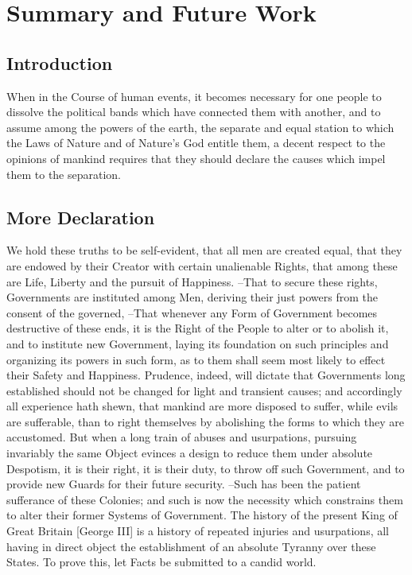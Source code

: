 \chapter{Summary and Future Work}

\section{Introduction}
When in the Course of human events, it becomes necessary for one people  to dissolve the political bands which have connected them with another,  and to assume among the powers of the earth, the separate and equal station  to which the Laws of Nature and of Nature's God entitle them, a decent respect to the opinions of mankind requires that they should declare  the causes which impel them to the separation.

\section{More Declaration}

We hold these truths to be self-evident, that all men are created equal,  that they are endowed by their Creator with certain unalienable Rights,  that among these are Life, Liberty and the pursuit of Happiness. --That to secure these  rights, Governments are instituted among Men, deriving their just powers  from the consent of the governed, --That whenever any Form of Government  becomes destructive of these ends, it is the Right of the People to alter  or to abolish it, and to institute new Government, laying its foundation on  such principles and organizing its powers in such form, as to them shall  seem most likely to effect their Safety and Happiness. Prudence, indeed, will dictate that Governments long established should not  be changed for light and transient causes; and accordingly all experience  hath shewn, that mankind are more disposed to suffer, while evils are  sufferable, than to right themselves by abolishing the forms to which they  are accustomed. But when a long train of abuses and usurpations, pursuing invariably the same  Object evinces a design to reduce them under absolute Despotism, it is their  right, it is their duty, to throw off such Government, and to provide new Guards for their future security. --Such has been the patient sufferance of these Colonies; and such is now the  necessity which constrains them to alter their former Systems of Government.  The history of the present King of Great Britain [George III] is a history  of repeated injuries and usurpations, all having in direct object the  establishment of an absolute Tyranny over these States. To prove this, let Facts be submitted to a candid world.